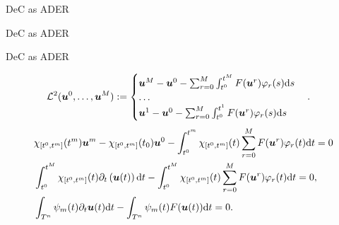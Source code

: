 \documentclass[9pt,compress,t,aspectratio=169]{beamer}
\begin{document}
\begin{frame}{DeC as ADER}
	
\end{frame}

\begin{frame}{DeC as ADER}
	
\end{frame}

\begin{frame}{DeC as ADER}

\begin{align*}\label{eq:L2op}
\mathcal{L}^2(\boldsymbol{u}^0, \dots, \boldsymbol{u}^M) &:=
\begin{cases}
\boldsymbol{u}^M-\boldsymbol{u}^0 -\sum_{r=0}^M \int_{t^0}^{t^M} F(\boldsymbol{u}^r) \varphi_r(s) {\mathrm{d}{s}}\\
\dots\\
\boldsymbol{u}^1-\boldsymbol{u}^0 - \sum_{r=0}^M \int_{t^0}^{t^1} F(\boldsymbol{u}^r) \varphi_r(s) {\mathrm{d}{s}}
\end{cases}.
\end{align*}
\pause
\begin{align*}
&	\chi_{[t^0,t^{m}]}(t^m)\boldsymbol{u}^m-\chi_{[t^0,t^{m}]}(t_0)\boldsymbol{u}^0-  \int_{t^0}^{t^m} \chi_{[t^0,t^{m}]}(t)   \sum_{r=0}^M F(\boldsymbol{u}^r)\varphi_r(t) {\mathrm{d}{t}}=0\\
 &\int_{t^0}^{t^M} \chi_{[t^0,t^{m}]}(t) \partial_t \left(\boldsymbol{u}(t)\right) {\mathrm{d}{t}}-
 \int_{t^0}^{t^M} \chi_{[t^0,t^{m}]}(t) \sum_{r=0}^M  F(\boldsymbol{u}^r) \varphi_r(t) {\mathrm{d}{t}}=0,\\
 &\int_{T^n} \psi_{m}(t) \partial_t \boldsymbol{u}(t) {\mathrm{d}{t}}- \int_{T^n} \psi_{m}(t)
 F(\boldsymbol{u}(t)) {\mathrm{d}{t}}=0. 
\end{align*}
\end{frame}
\end{document}
